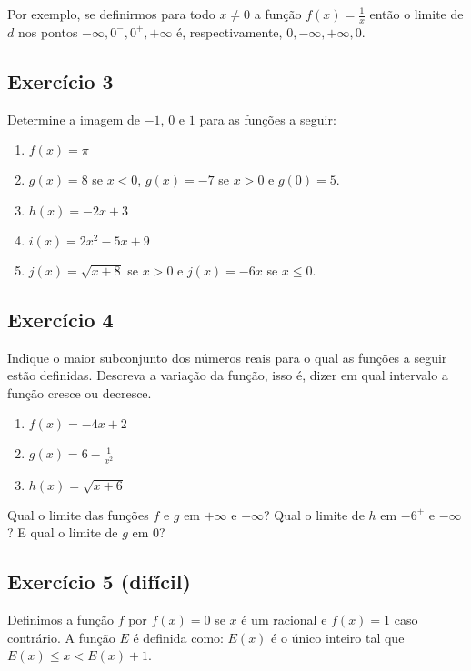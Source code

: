 Por exemplo,
se definirmos para todo $x \neq 0$ a função $f(x) = \frac{1}{x}$
então o limite de $d$ nos pontos $-\infty, 0^-, 0^+, +\infty$ é,
respectivamente, $0, -\infty, +\infty, 0$.

\subsection*{Exercício 3}

Determine a imagem de $-1$, $0$ e $1$ para as funções a seguir:

\begin{enumerate}
  \item $f(x) = \pi$
  \item $g(x) = 8$ se $x < 0$, $g(x) = -7$ se $x > 0$ e $g(0) = 5$.
  \item $h(x) = -2x + 3$
  \item $i(x) = 2x^2 - 5x + 9$
  \item $j(x) = \sqrt{x+8}$ se $x > 0$ e $j(x) = -6x$ se $x \leq 0$.
\end{enumerate}

\subsection*{Exercício 4}

Indique o maior subconjunto dos números reais
para o qual as funções a seguir estão definidas.
Descreva a variação da função,
isso é, dizer em qual intervalo a função cresce ou decresce.

\begin{enumerate}
  \item $f(x) = -4x + 2$
  \item $g(x) = 6 - \frac{1}{x^2}$
  \item $h(x) = \sqrt{x+6}$
\end{enumerate}

Qual o limite das funções $f$ e $g$ em $+\infty$ e $-\infty$?
Qual o limite de $h$ em ${-6}^+$ e $-\infty$?
E qual o limite de $g$ em $0$?

\subsection*{Exercício 5 (difícil)}

Definimos a função $f$ por $f(x) = 0$ se $x$ é um racional e
$f(x) = 1$ caso contrário. A função $E$ é definida como:
$E(x)$ é o único inteiro tal que
$E(x) \leq x < E(x) + 1$.

